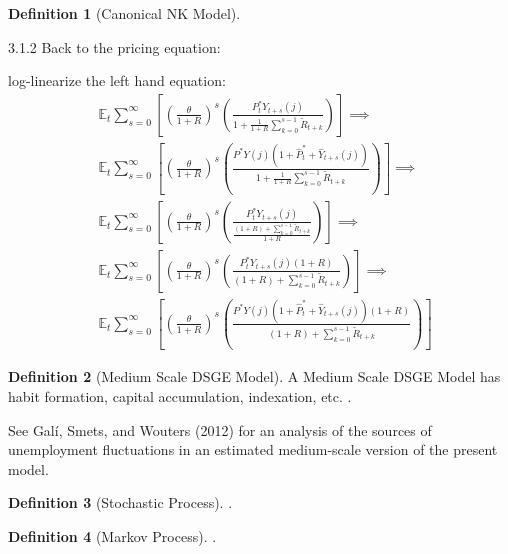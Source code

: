 \documentclass[
	12pt, 
	]{article}
\numberwithin{equation}{section}
\theoremstyle{definition}
\newtheorem{definition}{Definition}[section]
\theoremstyle{plain}
\theoremstyle{plain}
\theoremstyle{plain}
\begin{document}
\begin{definition}[Canonical NK Model]

\cite[Lecture 13, p.7]{solis-garcia_ucb_2022}

3.1.2 Back to the pricing equation:

log-linearize the left hand equation:
\begin{align*}
	&\mathbb{E}_t \sum_{s=0}^{\infty} 
	\left[ 
	\left( \frac{\theta}{1+R} \right)^s
	\left( \frac{P_t^\ast Y_{t+s}(j)}{1 + \frac{1}{1+R}
		\sum_{k=0}^{s-1} \widetilde{R}_{t+k}} \right) 
	\right]
	\implies \\
	&\mathbb{E}_t \sum_{s=0}^{\infty} 
	\left[ 
	\left( \frac{\theta}{1+R} \right)^s
	\left( \frac{P^\ast Y(j)(1+\widehat{P}_t^\ast + \widehat{Y}_{t+s}(j))}{1 + \frac{1}{1+R}
		\sum_{k=0}^{s-1} \widetilde{R}_{t+k}} \right) 
	\right] \implies \\
	&\mathbb{E}_t \sum_{s=0}^{\infty} 
	\left[ 
	\left( \frac{\theta}{1+R} \right)^s
	\left( \frac{P_t^\ast Y_{t+s}(j)}{\frac{(1+R)+\sum_{k=0}^{s-1} \widetilde{R}_{t+k}}{1+R}} \right) 
	\right]
	\implies \\
	&\mathbb{E}_t \sum_{s=0}^{\infty} 
	\left[ 
	\left( \frac{\theta}{1+R} \right)^s
	\left( \frac{P_t^\ast Y_{t+s}(j)(1+R)}{(1+R)+\sum_{k=0}^{s-1} \widetilde{R}_{t+k}} \right) 
	\right]
	\implies \\
	&\mathbb{E}_t \sum_{s=0}^{\infty} 
	\left[ 
	\left( \frac{\theta}{1+R} \right)^s
	\left( \frac{P^\ast Y(j)(1+\widehat{P}_t^\ast + \widehat{Y}_{t+s}(j))(1+R)}{(1+R)+\sum_{k=0}^{s-1} \widetilde{R}_{t+k}} \right) 
	\right]
\end{align*}
	
\end{definition}

\begin{definition}[Medium Scale DSGE Model]
	A Medium Scale DSGE Model has habit formation, capital accumulation, indexation, etc. \cite[p.208]{gali_monetary_2015}. 
	
	See Galí, Smets, and Wouters (2012) for an analysis of the sources of unemployment fluctuations in an estimated medium-scale version of the present model.
\end{definition}

\begin{definition}[Stochastic Process]
	\cite[Lecture 5, p.3]{solis-garcia_ucb_2022}.
\end{definition}

\begin{definition}[Markov Process]
	\cite[Lecture 5, p.4]{solis-garcia_ucb_2022}.
\end{definition}
\end{document}
